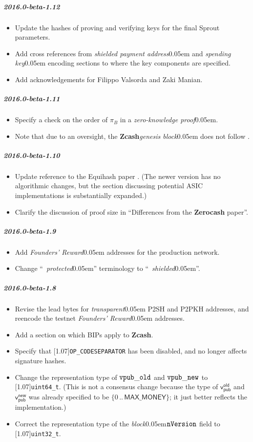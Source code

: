 \documentclass{article}
\let\oldtexttt\texttt
\let\oldmathtt\mathtt
\renewcommand{\texttt}[1]{\scalebox{1.02}[1.07]{\oldtexttt{#1}}}
\renewcommand{\mathtt}[1]{\scalebox{1.02}[1.07]{$\oldmathtt{#1}$}}
\newcommand{\introlist}{\needspace{15ex}}
\numberwithin{theorem}{subsection}
\newcommand{\term}[1]{\textsl{#1}\kern 0.05em\xspace}
\newcommand{\termbf}[1]{\textbf{#1}\xspace}
\newcommand{\quotedterm}[1]{``~\!\!\term{#1}''}
\newcommand{\Zcash}{\termbf{Zcash}}
\newcommand{\Zerocash}{\termbf{Zerocash}}
\newcommand{\zeroKnowledgeProof}{\term{zero-knowledge proof}}
\newcommand{\block}{\term{block}}
\newcommand{\genesisBlock}{\term{genesis block}}
\newcommand{\transparent}{\term{transparent}}
\newcommand{\paymentAddress}{\term{shielded payment address}}
\newcommand{\spendingKey}{\term{spending key}}
\newcommand{\setof}[1]{\{{#1}\}}
\newcommand{\barerange}[2]{{#1}\,..\,{#2}}
\newcommand{\range}[2]{\setof{\barerange{#1}{#2}}}
\newcommand{\MAXMONEY}{\mathsf{MAX\_MONEY}}
\newcommand{\foundersReward}{\term{Founders' Reward}}
\newcommand{\vpubOldField}{\mathtt{vpub\_old}}
\newcommand{\vpubNewField}{\mathtt{vpub\_new}}
\newcommand{\type}[1]{\texttt{#1}}
\newcommand{\ScriptOP}[1]{\texttt{OP\_{#1}}}
\newcommand{\nVersion}{\mathtt{nVersion}}
\newcommand{\Proof}[1]{\pi_{\!{#1}}}
\newcommand{\vpubOld}{\mathsf{v_{pub}^{old}}}
\newcommand{\vpubNew}{\mathsf{v_{pub}^{new}}}
\begin{document}
\introlist
\subparagraph{2016.0-beta-1.12}

\begin{itemize}
    \item Update the hashes of proving and verifying keys for the final Sprout parameters.
    \item Add cross references from \paymentAddress and \spendingKey encoding
          sections to where the key components are specified.
    \item Add acknowledgements for Filippo Valsorda and Zaki Manian.
\end{itemize}

\introlist
\subparagraph{2016.0-beta-1.11}

\begin{itemize}
    \item Specify a check on the order of $\Proof{B}$ in a \zeroKnowledgeProof.
    \item Note that due to an oversight, the \Zcash \genesisBlock does not
          follow \cite{BIP-34}.
\end{itemize}

\introlist
\subparagraph{2016.0-beta-1.10}

\begin{itemize}
    \item Update reference to the Equihash paper \cite{BK2016}. (The newer version
          has no algorithmic changes, but the section discussing potential ASIC
          implementations is substantially expanded.)
    \item Clarify the discussion of proof size in ``Differences from the \Zerocash paper''.
\end{itemize}

\introlist
\subparagraph{2016.0-beta-1.9}

\begin{itemize}
    \item Add \foundersReward addresses for the production network.
    \item Change \quotedterm{protected} terminology to \quotedterm{shielded}.
\end{itemize}

\introlist
\subparagraph{2016.0-beta-1.8}

\begin{itemize}
    \item Revise the lead bytes for \transparent P2SH and P2PKH addresses,
          and reencode the testnet \foundersReward addresses.
    \item Add a section on which BIPs apply to \Zcash.
    \item Specify that \ScriptOP{CODESEPARATOR} has been disabled, and
          no longer affects signature hashes.
    \item Change the representation type of $\vpubOldField$ and $\vpubNewField$
          to \type{uint64\_t}. (This is not a consensus change because the type of
          $\vpubOld$ and $\vpubNew$ was already specified to be $\range{0}{\MAXMONEY}$;
          it just better reflects the implementation.)
    \item Correct the representation type of the \block $\nVersion$ field to
          \type{uint32\_t}.
\end{itemize}
\end{document}
